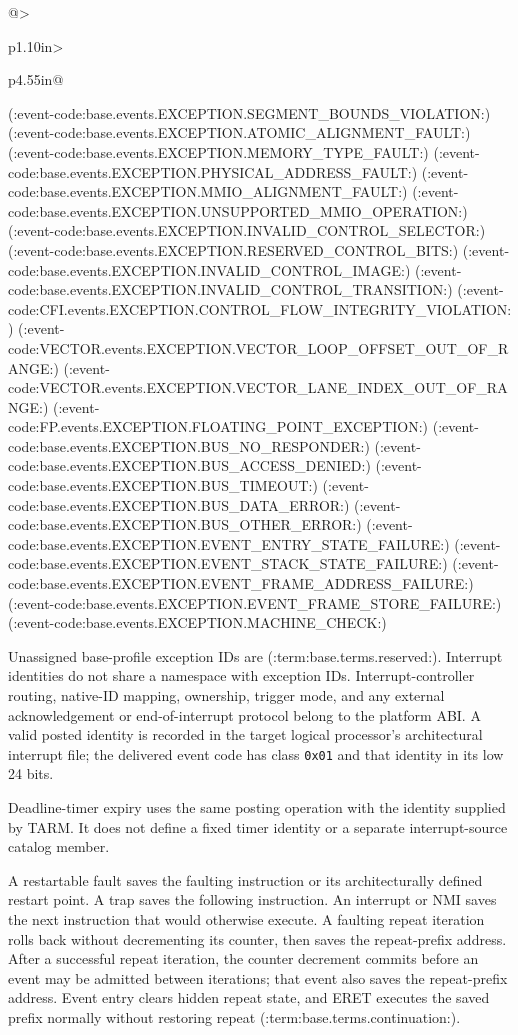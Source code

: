 \begin{BedrockLongTable}{@{}>{\raggedright\arraybackslash}p{1.10in}>{\raggedright\arraybackslash}p{4.55in}@{}}
(:event-code:base.events.EXCEPTION.SEGMENT_BOUNDS_VIOLATION:)
(:event-code:base.events.EXCEPTION.ATOMIC_ALIGNMENT_FAULT:)
(:event-code:base.events.EXCEPTION.MEMORY_TYPE_FAULT:)
(:event-code:base.events.EXCEPTION.PHYSICAL_ADDRESS_FAULT:)
(:event-code:base.events.EXCEPTION.MMIO_ALIGNMENT_FAULT:)
(:event-code:base.events.EXCEPTION.UNSUPPORTED_MMIO_OPERATION:)
(:event-code:base.events.EXCEPTION.INVALID_CONTROL_SELECTOR:)
(:event-code:base.events.EXCEPTION.RESERVED_CONTROL_BITS:)
(:event-code:base.events.EXCEPTION.INVALID_CONTROL_IMAGE:)
(:event-code:base.events.EXCEPTION.INVALID_CONTROL_TRANSITION:)
(:event-code:CFI.events.EXCEPTION.CONTROL_FLOW_INTEGRITY_VIOLATION:)
(:event-code:VECTOR.events.EXCEPTION.VECTOR_LOOP_OFFSET_OUT_OF_RANGE:)
(:event-code:VECTOR.events.EXCEPTION.VECTOR_LANE_INDEX_OUT_OF_RANGE:)
(:event-code:FP.events.EXCEPTION.FLOATING_POINT_EXCEPTION:)
(:event-code:base.events.EXCEPTION.BUS_NO_RESPONDER:)
(:event-code:base.events.EXCEPTION.BUS_ACCESS_DENIED:)
(:event-code:base.events.EXCEPTION.BUS_TIMEOUT:)
(:event-code:base.events.EXCEPTION.BUS_DATA_ERROR:)
(:event-code:base.events.EXCEPTION.BUS_OTHER_ERROR:)
(:event-code:base.events.EXCEPTION.EVENT_ENTRY_STATE_FAILURE:)
(:event-code:base.events.EXCEPTION.EVENT_STACK_STATE_FAILURE:)
(:event-code:base.events.EXCEPTION.EVENT_FRAME_ADDRESS_FAILURE:)
(:event-code:base.events.EXCEPTION.EVENT_FRAME_STORE_FAILURE:)
(:event-code:base.events.EXCEPTION.MACHINE_CHECK:)
\bottomrule
\end{BedrockLongTable}

Unassigned base-profile exception IDs are (:term:base.terms.reserved:). Interrupt identities do not share a namespace
with exception IDs. Interrupt-controller routing, native-ID mapping, ownership, trigger mode, and any external
acknowledgement or end-of-interrupt protocol belong to the platform ABI. A valid posted identity is recorded in the
target logical processor's architectural interrupt file; the delivered event code has class \texttt{0x01} and that
identity in its low 24 bits.

Deadline-timer expiry uses the same posting operation with the identity supplied by TARM. It does not define a
fixed timer identity or a separate interrupt-source catalog member.

A restartable fault saves the faulting instruction or its architecturally defined restart point. A trap saves the
following instruction. An interrupt or NMI saves the next instruction that would otherwise execute. A faulting repeat
iteration rolls back without decrementing its counter, then saves the repeat-prefix address. After a successful repeat
iteration, the counter decrement commits before an event may be admitted between iterations; that event also saves
the repeat-prefix address. Event entry clears hidden repeat state, and ERET executes the saved prefix normally without
restoring repeat (:term:base.terms.continuation:).
